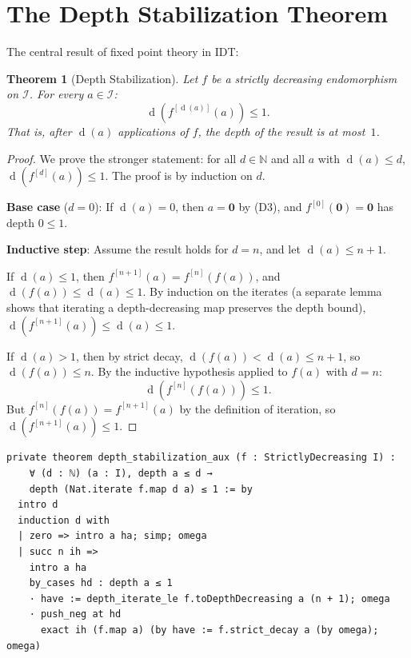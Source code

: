 \documentclass[11pt,openany]{book}
\theoremstyle{definition}
\theoremstyle{plain}
\newtheorem{theorem}[axiom]{Theorem}
\theoremstyle{remark}
\newcommand{\IS}{\mathcal{I}}               %
\newcommand{\void}{\mathbf{0}}              %
\newcommand{\depth}{\operatorname{d}}       %
\begin{document}
\section{The Depth Stabilization Theorem}

The central result of fixed point theory in IDT:

\begin{theorem}[Depth Stabilization]
\label{thm:depth-stabilization}
Let $f$ be a strictly decreasing endomorphism on $\IS$. For every $a \in \IS$:
\[
\depth(f^{[\depth(a)]}(a)) \leq 1.
\]
That is, after $\depth(a)$ applications of $f$, the depth of the result is at most~$1$.
\end{theorem}

\begin{proof}
We prove the stronger statement: for all $d \in \mathbb{N}$ and all $a$ with $\depth(a) \leq d$, $\depth(f^{[d]}(a)) \leq 1$. The proof is by induction on $d$.

\textbf{Base case} ($d = 0$): If $\depth(a) = 0$, then $a = \void$ by (D3), and $f^{[0]}(\void) = \void$ has depth $0 \leq 1$.

\textbf{Inductive step}: Assume the result holds for $d = n$, and let $\depth(a) \leq n + 1$.

If $\depth(a) \leq 1$, then $f^{[n+1]}(a) = f^{[n]}(f(a))$, and $\depth(f(a)) \leq \depth(a) \leq 1$. By induction on the iterates (a separate lemma shows that iterating a depth-decreasing map preserves the depth bound), $\depth(f^{[n+1]}(a)) \leq \depth(a) \leq 1$.

If $\depth(a) > 1$, then by strict decay, $\depth(f(a)) < \depth(a) \leq n + 1$, so $\depth(f(a)) \leq n$. By the inductive hypothesis applied to $f(a)$ with $d = n$:
\[
\depth(f^{[n]}(f(a))) \leq 1.
\]
But $f^{[n]}(f(a)) = f^{[n+1]}(a)$ by the definition of iteration, so $\depth(f^{[n+1]}(a)) \leq 1$.
\end{proof}

\begin{lstlisting}
private theorem depth_stabilization_aux (f : StrictlyDecreasing I) :
    ∀ (d : ℕ) (a : I), depth a ≤ d →
    depth (Nat.iterate f.map d a) ≤ 1 := by
  intro d
  induction d with
  | zero => intro a ha; simp; omega
  | succ n ih =>
    intro a ha
    by_cases hd : depth a ≤ 1
    · have := depth_iterate_le f.toDepthDecreasing a (n + 1); omega
    · push_neg at hd
      exact ih (f.map a) (by have := f.strict_decay a (by omega); omega)
\end{lstlisting}
\end{document}
